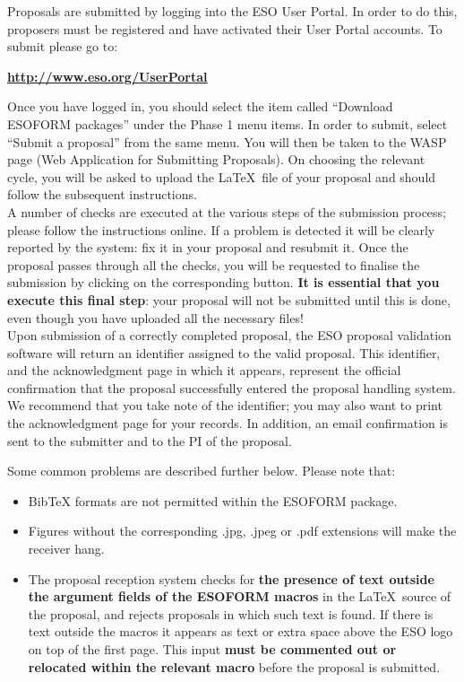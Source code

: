 \documentclass{article}
\begin{document}
Proposals are submitted by logging into the ESO User Portal.
In order to do this, proposers must be registered and have activated
their User Portal accounts. To submit please go to:
\begin{center}
  \href{http://www.eso.org/UserPortal}{\bf \underline{http://www.eso.org/UserPortal}}
\end{center}
Once you have logged in, you should select the item called ``Download ESOFORM packages'' under the Phase 1 menu items.  In order to submit, select ``Submit a proposal'' from the same menu. You will then be taken to the WASP page (Web Application for Submitting Proposals). On choosing the relevant cycle, you will be asked to upload the \LaTeX\ file of your proposal and should follow the subsequent instructions. \\
A number of checks are executed at the various steps of the submission process;
please follow the instructions online. If a problem is detected 
it will be clearly reported by the system: fix it in your proposal and
resubmit it. Once the proposal passes through all the checks, you will be requested to finalise the submission by clicking on the corresponding button. {\bf It is essential that you execute this final step}: your proposal will not be submitted until this is done, even though you have uploaded all the necessary files! \\
Upon submission of a correctly completed proposal, the ESO proposal validation
software will return an identifier assigned to the valid proposal. This
identifier, and the acknowledgment page in which it appears, represent
the official confirmation that the proposal successfully entered the
proposal handling system. We recommend that you take note of the
identifier; you may also want to print the acknowledgment page for
your records. In addition, an email confirmation
is sent to the submitter and to the PI of the proposal.

Some common problems are described further below. Please note that:
\begin{itemize}
\item BibTeX formats are not permitted within the ESOFORM package.
\item Figures without the corresponding .jpg, .jpeg or .pdf extensions will make the   
  receiver hang.
\item The proposal reception system checks for {\bf the presence of text outside
  the argument fields of the ESOFORM macros} in the \LaTeX\ source of
  the proposal, and rejects proposals in which such text is
  found. If there is text outside the macros it appears as text or extra space above 
  the ESO logo on top of the first page.  
  This input {\bf must be commented out or relocated within the relevant macro} before the   
  proposal is submitted. 

\end{itemize}
\end{document}
